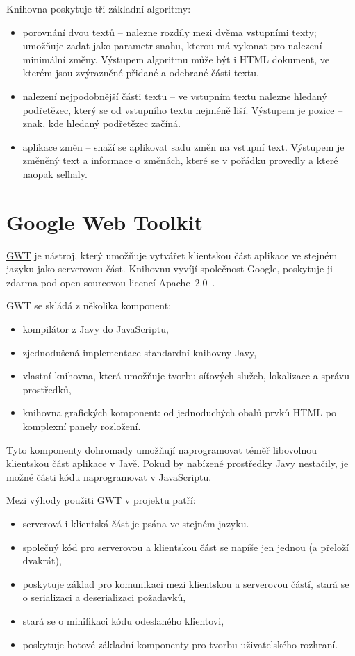 Knihovna poskytuje tři základní algoritmy:
\begin{itemize}
	\item porovnání dvou textů -- nalezne rozdíly mezi dvěma vstupními texty; umožňuje zadat jako parametr snahu, kterou má vykonat pro nalezení minimální změny.
		Výstupem algoritmu může být i HTML dokument, ve kterém jsou zvýrazněné přidané a odebrané části textu.
	\item nalezení nejpodobnější části textu -- ve vstupním textu nalezne hledaný podřetězec, který se od vstupního textu nejméně liší.
		Výstupem je pozice -- znak, kde hledaný podřetězec začíná.
	\item aplikace změn -- snaží se aplikovat sadu změn na vstupní text.
		Výstupem je změněný text a informace o změnách, které se v pořádku provedly a které naopak selhaly.
\end{itemize}

\section{Google Web Toolkit}

\href{http://www.gwtproject.org/}{GWT} je nástroj, který umožňuje vytvářet klientskou část aplikace ve stejném jazyku jako serverovou část.
Knihovnu vyvíjí společnost Google, poskytuje ji zdarma pod open-sourcovou licencí Apache~2.0~\cite{apache20}.

GWT se skládá z několika komponent:
\begin{itemize}
	\item kompilátor z Javy do JavaScriptu,
	\item zjednodušená implementace standardní knihovny Javy,
	\item vlastní knihovna, která umožňuje tvorbu síťových služeb, lokalizace a správu prostředků,
	\item knihovna grafických komponent: od jednoduchých obalů prvků HTML po komplexní panely rozložení.
\end{itemize}

Tyto komponenty dohromady umožňují naprogramovat téměř libovolnou klientskou část aplikace v Javě.
Pokud by nabízené prostředky Javy nestačily, je možné části kódu naprogramovat v JavaScriptu.

Mezi výhody použiti GWT v projektu patří:
\begin{itemize}
    \item serverová i klientská část je psána ve stejném jazyku.
    \item společný kód pro serverovou a klientskou část se napíše jen jednou (a přeloží dvakrát),
    \item poskytuje základ pro komunikaci mezi klientskou a serverovou částí, stará se o serializaci a deserializaci požadavků,
    \item stará se o minifikaci kódu odeslaného klientovi,
    \item poskytuje hotové základní komponenty pro tvorbu uživatelského rozhraní.
\end{itemize}

